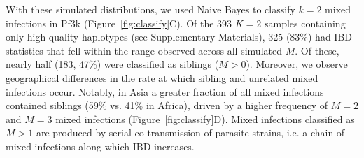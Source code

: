 \documentclass[9pt,lineno]{elife}
\begin{document}
With these simulated distributions, we used Naive Bayes to classify $k=2$ mixed infections in Pf3k (Figure~\ref{fig:classify}C).  Of the 393  $K = 2$ samples containing only high-quality haplotypes (see Supplementary Materials), 325 (83\%) had IBD statistics that fell within the range observed across all simulated $M$. Of these, nearly half (183, 47\%) were classified as siblings ($M > 0$).  Moreover, we observe geographical differences in the rate at which sibling and unrelated mixed infections occur. Notably, in Asia a greater fraction of all mixed infections contained siblings (59\% vs. 41\% in Africa), driven by a higher frequency of $M=2$ and $M=3$ mixed infections (Figure~\ref{fig:classify}D).  Mixed infections classified as $M>1$ are produced by serial co-transmission of  parasite strains, i.e. a chain of mixed infections along which IBD increases.
\end{document}
